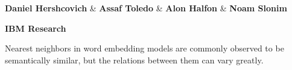 \documentclass[extrafontsizes,60pt,twocolumn]{memoir}
\begin{document}
\setlength{\columnseprule}{0.4pt}
\setlength{\abovedisplayskip}{3pt}
\setlength{\belowdisplayskip}{3pt}

\begin{strip}
  \begin{center}
  \end{center}
  \begin{center}
  \begin{minipage}[b]{.9\linewidth}
    \centering
    \begin{minipage}{.7\linewidth}
      \HUGE\textbf{Daniel Hershcovich} \& \textbf{Assaf Toledo} \& \textbf{Alon Halfon} \& \textbf{Noam Slonim}
    \end{minipage}
    \begin{minipage}{.25\linewidth}
      \HUGE\textbf{IBM Research}
    \end{minipage}
    
    \vspace{.5in}
    \titlespacing*{\section}{0pt}{8mm}{.5in}
    \begin{adjustbox}{margin=.5in,frame,minipage=\textwidth,center}
      \centering\huge
      Nearest neighbors in word embedding models are commonly observed to be
    semantically similar, but the relations between them can vary greatly.
    \end{adjustbox}
  \end{minipage}
  \end{center}
\end{strip}





\begin{minipage}{.42\columnwidth}
\color{DarkSlateGray}
\tiny
\setlength\bibitemsep{0pt}


\end{minipage}
\hspace{.3in}
\begin{minipage}{.475\columnwidth}
\color{Black}
\end{minipage}
\end{document}
